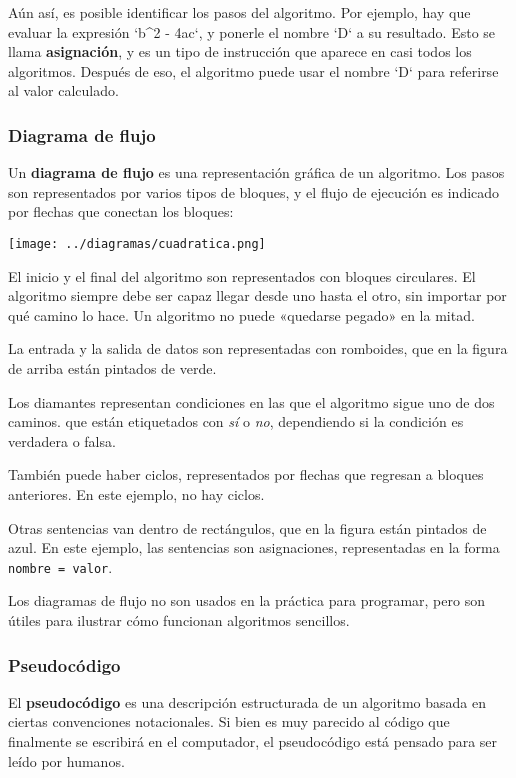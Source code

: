 Aún así, es posible identificar los pasos del algoritmo. Por ejemplo,
hay que evaluar la expresión `b\^{}2 - 4ac`, y ponerle el nombre `D` a
su resultado. Esto se llama \textbf{asignación}, y es un tipo de
instrucción que aparece en casi todos los algoritmos. Después de eso, el
algoritmo puede usar el nombre `D` para referirse al valor calculado.

\subsubsection{Diagrama de flujo}

Un \textbf{diagrama de flujo} es una representación gráfica de un
algoritmo. Los pasos son representados por varios tipos de bloques, y el
flujo de ejecución es indicado por flechas que conectan los bloques:

\texttt{[image: ../diagramas/cuadratica.png]}

El inicio y el final del algoritmo son representados con bloques
circulares. El algoritmo siempre debe ser capaz llegar desde uno hasta
el otro, sin importar por qué camino lo hace. Un algoritmo no puede
«quedarse pegado» en la mitad.

La entrada y la salida de datos son representadas con romboides, que en
la figura de arriba están pintados de verde.

Los diamantes representan condiciones en las que el algoritmo sigue uno
de dos caminos. que están etiquetados con \emph{sí} o \emph{no},
dependiendo si la condición es verdadera o falsa.

También puede haber ciclos, representados por flechas que regresan a
bloques anteriores. En este ejemplo, no hay ciclos.

Otras sentencias van dentro de rectángulos, que en la figura están
pintados de azul. En este ejemplo, las sentencias son asignaciones,
representadas en la forma \lstinline!nombre = valor!.

Los diagramas de flujo no son usados en la práctica para programar, pero
son útiles para ilustrar cómo funcionan algoritmos sencillos.

\subsubsection{Pseudocódigo}

El \textbf{pseudocódigo} es una descripción estructurada de un algoritmo
basada en ciertas convenciones notacionales. Si bien es muy parecido al
código que finalmente se escribirá en el computador, el pseudocódigo
está pensado para ser leído por humanos.

